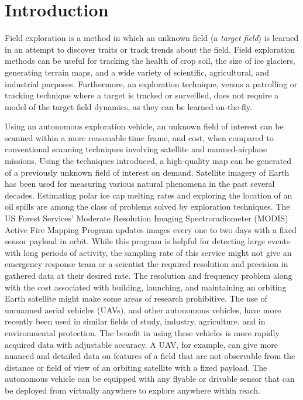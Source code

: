 
\chapter{Introduction}
Field exploration is a method in which an unknown field (a \textit{target field}) is learned in an attempt to discover traits or track trends about the field. Field exploration methods can be useful for tracking the health of crop soil, the size of ice glaciers, generating terrain maps, and a wide variety of scientific, agricultural, and industrial purposes. Furthermore, an exploration technique, versus a patrolling or tracking technique where a target is tracked or surveilled, does not require a model of the target field dynamics, as they can be learned on-the-fly.

Using an autonomous exploration vehicle, an unknown field of interest can be scanned within a more reasonable time frame, and cost, when compared to conventional scanning techniques involving satellite and manned-airplane missions. Using the techniques introduced, a high-quality map can be generated of a previously unknown field of interest on demand. Satellite imagery of Earth has been used for measuring various natural phenomena in the past several decades. Estimating polar ice cap melting rates and exploring the location of an oil spills are among the class of problems solved by exploration techniques. The US Forest Services' Moderate Resolution Imaging Spectroradiometer (MODIS) Active Fire Mapping Program updates images every one to two days with a fixed sensor payload in orbit. While this program is helpful for detecting large events with long periods of activity, the sampling rate of this service might not give an emergency response team or a scientist the required resolution and precision in gathered data at their desired rate. The resolution and frequency problem along with the cost associated with building, launching, and maintaining an orbiting Earth satellite might make some areas of research prohibitive. The use of unmanned aerial vehicles (UAVs), and other autonomous vehicles, have more recently been used in similar fields of study, industry, agriculture, and in environmental protection. The benefit in using these vehicles is more rapidly acquired data with adjustable accuracy. A UAV, for example, can give more nuanced and detailed data on features of a field that are not observable from the distance or field of view of an orbiting satellite with a fixed payload. The autonomous vehicle can be equipped with any flyable or drivable sensor that can be deployed from virtually anywhere to explore anywhere within reach.

